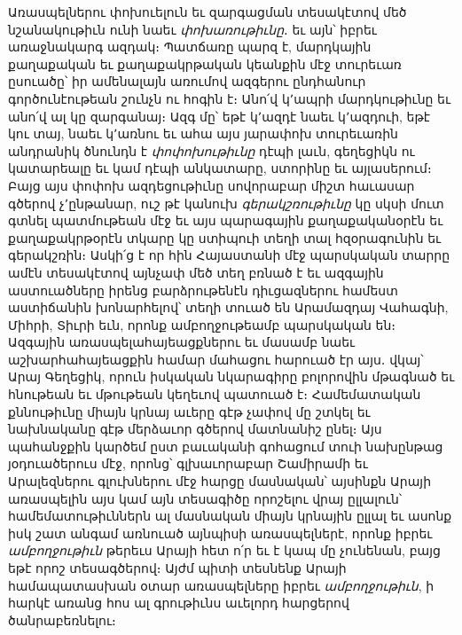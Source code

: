 \documentclass{article}
\begin{document}
{Առասպելներու փոխուելուն եւ զարգացման տեսակէտով մեծ նշանակութիւն ունի նաեւ \emph{փոխառութիւնը}․ եւ այն՝ իբրեւ առաջնակարգ ազդակ։ Պատճառը պարզ է, մարդկային քաղաքական եւ քաղաքակրթական կեանքին մէջ տուրեւառ ըսուածը՝ իր ամենալայն առումով ազգերու ընդհանուր գործունէութեան շունչն ու հոգին է։ Անո՛վ կ՚ապրի մարդկութիւնը եւ անո՛վ ալ կը զարգանայ։ Ազգ մը՝ եթէ կ՚ազդէ նաեւ կ՚ազդուի, եթէ կու տայ, նաեւ կ՚առնու եւ ահա այս յարափոխ տուրեւառին անդրանիկ ծնունդն է \emph{փոփոխութիւնը} դէպի լաւն, գեղեցիկն ու կատարեալը եւ կամ դէպի անկատարը, ստորինը եւ այլասերում։ Բայց այս փոփոխ ազդեցութիւնը սովորաբար միշտ հաւասար գծերով չ՚ընթանար, ուշ թէ կանուխ \emph{գերակշռութիւնը} կը սկսի մուտ գտնել պատմութեան մէջ եւ այս պարագային քաղաքականօրէն եւ քաղաքակրթօրէն տկարը կը ստիպուի տեղի տալ հզօրագունին եւ գերակշռին։ Ասկի՛ց է որ հին Հայաստանի մէջ պարսկական տարրը ամէն տեսակէտով այնչափ մեծ տեղ բռնած է եւ ազգային աստուածները իրենց բարձրութենէն դիւցազներու համեստ աստիճանին խոնարհելով՝ տեղի տուած են Արամազդայ Վահագնի, Միհրի, Տիւրի եւն, որոնք ամբողջութեամբ պարսկական են։ Ազգային առասպելահայեացքներու եւ մասամբ նաեւ աշխարհահայեացքին համար մահացու հարուած էր այս․ վկայ՝ Արայ Գեղեցիկ, որուն իսկական նկարագիրը բոլորովին մթագնած եւ հնութեան եւ մթութեան կեղեւով պատուած է։ Համեմատական քննութիւնը միայն կրնայ աւերը գէթ չափով մը շտկել եւ նախնականը գէթ մերձաւոր գծերով մատնանիշ ընել։ Այս պահանջքին կարծեմ ըստ բաւականի գոհացում տուի նախընթաց յօդուածերուս մէջ, որոնց՝ գլխաւորաբար Շամիրամի եւ Արալեզներու գլուխներու մէջ հարցը մասնական՝ այսինքն Արայի առասպելին այս կամ այն տեսագիծը որոշելու վրայ ըլլալուն՝ համեմատութիւններն ալ մասնական միայն կրնային ըլլալ եւ ասոնք իսկ շատ անգամ առնուած այնպիսի առասպելներէ, որոնք իբրեւ \emph{ամբողջութիւն} թերեւս Արայի հետ ո՛ր եւ է կապ մը չունենան, բայց եթէ որոշ տեսագծերով։ Այժմ պիտի տեսնենք Արայի համապատասխան օտար առասպելները իբրեւ \emph{ամբողջութիւն}, ի հարկէ առանց հոս ալ գրութիւնս աւելորդ հարցերով ծանրաբեռնելու։

}
\end{document}
